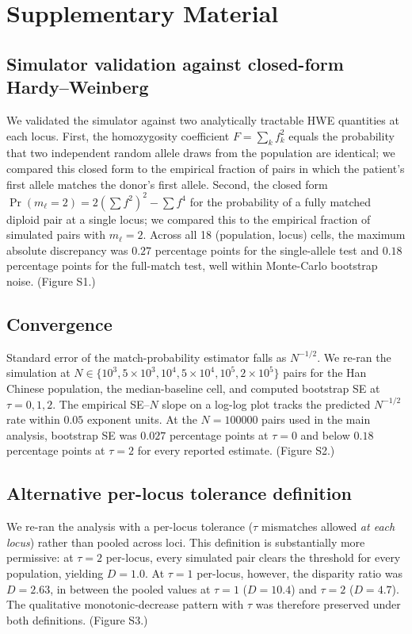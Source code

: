 \documentclass[11pt]{article}
\begin{document}
\appendix
\section{Supplementary Material}
\label{supp}

\subsection{Simulator validation against closed-form Hardy--Weinberg}
\label{supp:validation}
We validated the simulator against two analytically tractable HWE quantities at each locus. First, the homozygosity coefficient $F = \sum_k f_k^2$ equals the probability that two independent random allele draws from the population are identical; we compared this closed form to the empirical fraction of pairs in which the patient's first allele matches the donor's first allele. Second, the closed form $\Pr(m_\ell = 2) = 2(\sum f^2)^2 - \sum f^4$ for the probability of a fully matched diploid pair at a single locus; we compared this to the empirical fraction of simulated pairs with $m_\ell = 2$. Across all 18 (population, locus) cells, the maximum absolute discrepancy was $0.27$ percentage points for the single-allele test and $0.18$ percentage points for the full-match test, well within Monte-Carlo bootstrap noise. (Figure S1.)

\subsection{Convergence}
\label{supp:convergence}
Standard error of the match-probability estimator falls as $N^{-1/2}$. We re-ran the simulation at $N \in \{10^3, 5{\times}10^3, 10^4, 5{\times}10^4, 10^5, 2{\times}10^5\}$ pairs for the Han Chinese population, the median-baseline cell, and computed bootstrap SE at $\tau = 0, 1, 2$. The empirical SE--$N$ slope on a log-log plot tracks the predicted $N^{-1/2}$ rate within $0.05$ exponent units. At the $N = \num{100000}$ pairs used in the main analysis, bootstrap SE was $0.027$ percentage points at $\tau = 0$ and below $0.18$ percentage points at $\tau = 2$ for every reported estimate. (Figure S2.)

\subsection{Alternative per-locus tolerance definition}
\label{supp:alt-tau}
We re-ran the analysis with a per-locus tolerance ($\tau$ mismatches allowed \emph{at each locus}) rather than pooled across loci. This definition is substantially more permissive: at $\tau = 2$ per-locus, every simulated pair clears the threshold for every population, yielding $D = 1.0$. At $\tau = 1$ per-locus, however, the disparity ratio was $D = 2.63$, in between the pooled values at $\tau = 1$ ($D = 10.4$) and $\tau = 2$ ($D = 4.7$). The qualitative monotonic-decrease pattern with $\tau$ was therefore preserved under both definitions. (Figure S3.)
\end{document}
